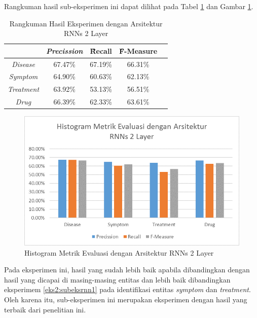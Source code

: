     Rangkuman hasil sub-eksperimen ini dapat dilihat pada Tabel \ref{table:owndict10} dan Gambar \ref{fig:owndict10}.
    
    \begin{table}
    	\centering
    	\caption{Rangkuman Hasil Eksperimen dengan Arsitektur RNNs 2 Layer}
    	\begin{tabular}{|c|c|c|c|c|}
    		\hline
    		& \textit{Precission} & \f{\f{Recall}} & \f{\f{F-Measure}} \\ \hline
    		\textit{Disease}      & 67.47\%             & 67.19\%        & 66.31\%           \\ \hline
    		\textit{Symptom}      & 64.90\%             & 60.63\%        & 62.13\%           \\ \hline
    		\textit{Treatment}    & 63.92\%             & 53.13\%        & 56.51\%           \\ \hline
    		\textit{Drug}		  & 66.39\%             & 62.33\%        & 63.61\%           \\ \hline
    	\end{tabular}
    	\label{table:owndict10}
    \end{table}
    
    \begin{figure}
    	\centering
    	\includegraphics[width=0.85\linewidth]{images/histogramrnnv2}
    	\caption{Histogram Metrik Evaluasi dengan Arsitektur RNNs 2 Layer}
    	\label{fig:owndict10}
    \end{figure}

	Pada eksperimen ini, hasil yang sudah lebih baik apabila dibandingkan dengan hasil yang dicapai \cite{skripsiKakRadit} di masing-masing entitas dan lebih baik dibandingkan eksperimem \ref{eks2:subeksrnn1} pada identifikasi entitas \textit{symptom} dan \textit{treatment}. Oleh karena itu, sub-eksperimen ini merupakan eksperimen dengan hasil yang terbaik dari penelitian ini.
